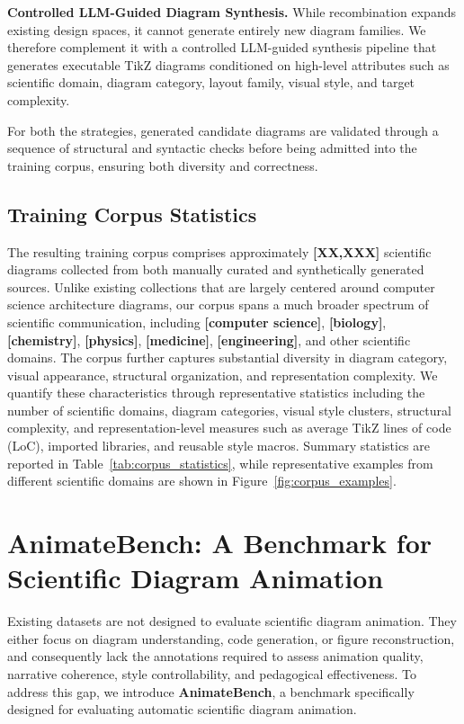 \documentclass{article} %
\begin{document}
\noindent\textbf{Controlled LLM-Guided Diagram Synthesis.}
While recombination expands existing design spaces, it cannot generate entirely new diagram families. We therefore complement it with a controlled LLM-guided synthesis pipeline that generates executable TikZ diagrams conditioned on high-level attributes such as scientific domain, diagram category, layout family, visual style, and target complexity. 

For both the strategies, generated candidate diagrams are validated through a sequence of structural and syntactic checks before being admitted into the training corpus, ensuring both diversity and correctness.

\subsection{Training Corpus Statistics}

The resulting training corpus comprises approximately \textbf{[XX,XXX]} scientific diagrams collected from both manually curated and synthetically generated sources. Unlike existing collections that are largely centered around computer science architecture diagrams, our corpus spans a much broader spectrum of scientific communication, including \textbf{[computer science]}, \textbf{[biology]}, \textbf{[chemistry]}, \textbf{[physics]}, \textbf{[medicine]}, \textbf{[engineering]}, and other scientific domains. The corpus further captures substantial diversity in diagram category, visual appearance, structural organization, and representation complexity. We quantify these characteristics through representative statistics including the number of scientific domains, diagram categories, visual style clusters, structural complexity, and representation-level measures such as average TikZ lines of code (LoC), imported libraries, and reusable style macros. Summary statistics are reported in Table~\ref{tab:corpus_statistics}, while representative examples from different scientific domains are shown in Figure~\ref{fig:corpus_examples}.

\section{AnimateBench: A Benchmark for Scientific Diagram Animation}

Existing datasets are not designed to evaluate scientific diagram animation. They either focus on diagram understanding, code generation, or figure reconstruction, and consequently lack the annotations required to assess animation quality, narrative coherence, style controllability, and pedagogical effectiveness. To address this gap, we introduce \textbf{AnimateBench}, a benchmark specifically designed for evaluating automatic scientific diagram animation.
\end{document}
